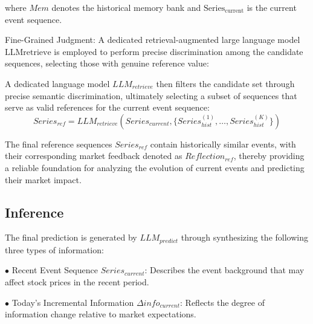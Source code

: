 \documentclass[sigconf, nonacm]{acmart} %
\begin{document}
where $Mem$ denotes the historical memory bank and $\text{Series}_{\text{current}}$ is the current event sequence.

Fine-Grained Judgment: A dedicated retrieval-augmented large language model $\mathrm{LLM}{\text{retrieve}}$ is employed to perform precise discrimination among the candidate sequences, selecting those with genuine reference value:


A dedicated language model $LLM_{retrieve}$ then filters the candidate set through precise semantic discrimination, ultimately selecting a subset of sequences that serve as valid references for the current event sequence:
\begin{equation}
    Series_{ref} = LLM_{retrieve} \left( Series_{current}, \{ Series_{hist}^{(1)}, \dots, Series_{hist}^{(K)} \} \right)
\end{equation}


The final reference sequences $Series_{ref}$ contain historically similar events, with their corresponding market feedback denoted as $Reflection_{ref}$, thereby providing a reliable foundation for analyzing the evolution of current events and predicting their market impact.

\subsection{Inference}

The final prediction is generated by $LLM_{predict}$ through synthesizing the following three types of information:

$\bullet$ Recent Event Sequence $Series_{current}$: Describes the event background that may affect stock prices in the recent period.

$\bullet$ Today's Incremental Information $\Delta info_{current}$: Reflects the degree of information change relative to market expectations.
\end{document}
